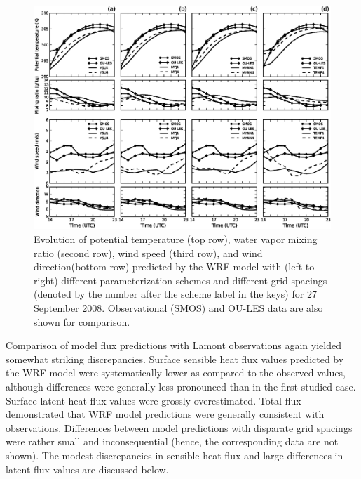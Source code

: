 \begin{figure}[ht!]
\begin{center}
\includegraphics[width=\textwidth]{figures/chapter4/meteogram_grid_20080927}
\end{center}
\caption{Evolution of potential temperature (top row), water vapor mixing ratio (second row), wind speed (third row), and wind direction(bottom row) predicted by the WRF model with (left to right) different parameterization schemes and different grid spacings (denoted by the number after the scheme label in the keys) for 27 September 2008. Observational (SMOS) and OU-LES data are also shown for comparison.}
\label{figure412}
\end{figure}


Comparison of model flux predictions with Lamont observations again yielded somewhat striking discrepancies. Surface sensible heat flux values predicted by the WRF model were systematically lower as compared to the observed values, although differences were generally less pronounced than in the first studied case. Surface latent heat flux values were grossly overestimated. Total flux demonstrated that WRF model predictions were generally consistent with observations. Differences between model predictions with disparate grid spacings were rather small and inconsequential (hence, the corresponding data are not shown). The modest discrepancies in sensible heat flux and large differences in latent flux values are discussed below. 


